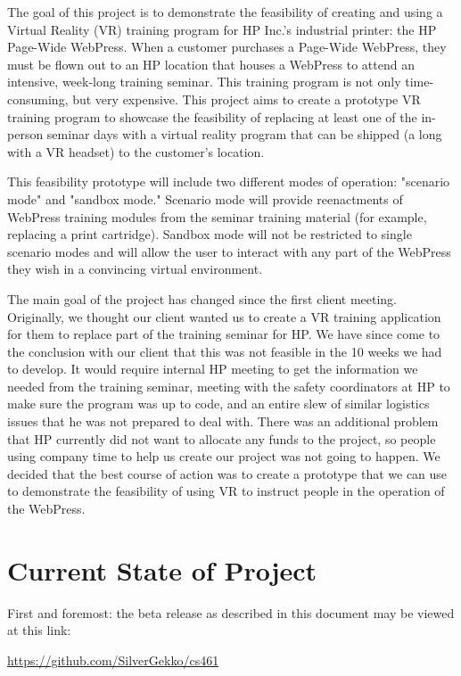 \documentclass[onecolumn, draftclsnofoot,10pt, compsoc]{IEEEtran}
\begin{document}
The goal of this project is to demonstrate the feasibility of creating and using a Virtual Reality (VR) training program for HP Inc.'s industrial printer: the HP Page-Wide WebPress. When a customer purchases a Page-Wide WebPress, they must be flown out to an HP location that houses a WebPress to attend an intensive, week-long training seminar. This training program is not only time-consuming, but very expensive. This project aims to create a prototype VR training program to showcase the feasibility of replacing at least one of the in-person seminar days with a virtual reality program that can be shipped (a long with a VR headset) to the customer's location.

This feasibility prototype will include two different modes of operation: "scenario mode" and "sandbox mode." Scenario mode will provide reenactments of WebPress training modules from the seminar training material (for example, replacing a print cartridge). Sandbox mode will not be restricted to single scenario modes and will allow the user to interact with any part of the WebPress they wish in a convincing virtual environment.

The main goal of the project has changed since the first client meeting. Originally, we thought our client wanted us to create a VR training application for them to replace part of the training seminar for HP. We have since come to the conclusion with our client that this was not feasible in the 10 weeks we had to develop. It would require internal HP meeting to get the information we needed from the training seminar, meeting with the safety coordinators at HP to make sure the program was up to code, and an entire slew of similar logistics issues that he was not prepared to deal with. There was an additional problem that HP currently did not want to allocate any funds to the project, so people using company time to help us create our project was not going to happen. We decided that the best course of action was to create a prototype that we can use to demonstrate the feasibility of using VR to instruct people in the operation of the WebPress.

\section{Current State of Project}

First and foremost: the beta release as described in this document may be viewed at this link: 

\noindent
\href{https://github.com/SilverGekko/cs461}{https://github.com/SilverGekko/cs461}\\
\end{document}
